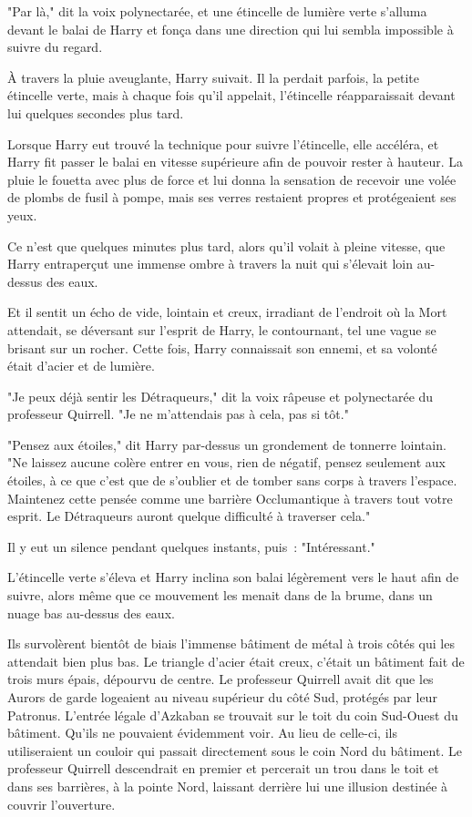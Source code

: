 "Par là," dit la voix polynectarée, et une étincelle de lumière verte s'alluma devant le balai de Harry et fonça dans une direction qui lui sembla impossible à suivre du regard.

À travers la pluie aveuglante, Harry suivait. Il la perdait parfois, la petite étincelle verte, mais à chaque fois qu'il appelait, l'étincelle réapparaissait devant lui quelques secondes plus tard.

Lorsque Harry eut trouvé la technique pour suivre l'étincelle, elle accéléra, et Harry fit passer le balai en vitesse supérieure afin de pouvoir rester à hauteur. La pluie le fouetta avec plus de force et lui donna la sensation de recevoir une volée de plombs de fusil à pompe, mais ses verres restaient propres et protégeaient ses yeux.

Ce n'est que quelques minutes plus tard, alors qu'il volait à pleine vitesse, que Harry entraperçut une immense ombre à travers la nuit qui s'élevait loin au-dessus des eaux.

Et il sentit un écho de vide, lointain et creux, irradiant de l'endroit où la Mort attendait, se déversant sur l'esprit de Harry, le contournant, tel une vague se brisant sur un rocher. Cette fois, Harry connaissait son ennemi, et sa volonté était d'acier et de lumière.

"Je peux déjà sentir les Détraqueurs," dit la voix râpeuse et polynectarée du professeur Quirrell. "Je ne m'attendais pas à cela, pas si tôt."

"Pensez aux étoiles," dit Harry par-dessus un grondement de tonnerre lointain. "Ne laissez aucune colère entrer en vous, rien de négatif, pensez seulement aux étoiles, à ce que c'est que de s'oublier et de tomber sans corps à travers l'espace. Maintenez cette pensée comme une barrière Occlumantique à travers tout votre esprit. Le Détraqueurs auront quelque difficulté à traverser cela."

Il y eut un silence pendant quelques instants, puis~: "Intéressant."

L'étincelle verte s'éleva et Harry inclina son balai légèrement vers le haut afin de suivre, alors même que ce mouvement les menait dans de la brume, dans un nuage bas au-dessus des eaux.

Ils survolèrent bientôt de biais l'immense bâtiment de métal à trois côtés qui les attendait bien plus bas. Le triangle d'acier était creux, c'était un bâtiment fait de trois murs épais, dépourvu de centre. Le professeur Quirrell avait dit que les Aurors de garde logeaient au niveau supérieur du côté Sud, protégés par leur Patronus. L'entrée légale d'Azkaban se trouvait sur le toit du coin Sud-Ouest du bâtiment. Qu'ils ne pouvaient évidemment voir. Au lieu de celle-ci, ils utiliseraient un couloir qui passait directement sous le coin Nord du bâtiment. Le professeur Quirrell descendrait en premier et percerait un trou dans le toit et dans ses barrières, à la pointe Nord, laissant derrière lui une illusion destinée à couvrir l'ouverture.

